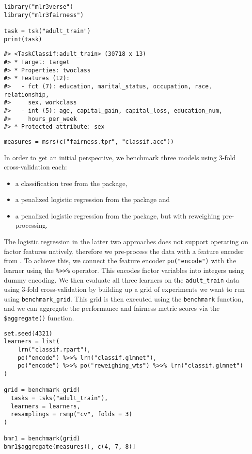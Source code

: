 \begin{verbatim}
library("mlr3verse")
library("mlr3fairness")

task = tsk("adult_train")
print(task)
\end{verbatim}

\begin{verbatim}
#> <TaskClassif:adult_train> (30718 x 13)
#> * Target: target
#> * Properties: twoclass
#> * Features (12):
#>   - fct (7): education, marital_status, occupation, race, relationship,
#>     sex, workclass
#>   - int (5): age, capital_gain, capital_loss, education_num,
#>     hours_per_week
#> * Protected attribute: sex
\end{verbatim}

\begin{verbatim}
measures = msrs(c("fairness.tpr", "classif.acc"))
\end{verbatim}

In order to get an initial perspective, we benchmark three models using 3-fold cross-validation each:

\begin{itemize}
\tightlist
\item
  a classification tree from the  package,
\item
  a penalized logistic regression from the  package and
\item
  a penalized logistic regression from the  package, but with reweighing pre-
  processing.
\end{itemize}

The logistic regression in the latter two approaches does not support operating on factor features natively, therefore we pre-process the data with a feature encoder from .
To achieve this, we connect the feature encoder \texttt{po("encode")} with the learner using the \texttt{\%\textgreater{}\textgreater{}\%} operator.
This encodes factor variables into integers using dummy encoding.
We then evaluate all three learners on the \texttt{adult\_train} data using 3-fold cross-validation by building up a grid of experiments we want to run using \texttt{benchmark\_grid}.
This grid is then executed using the \texttt{benchmark} function, and we can aggregate the performance and fairness metric scores via the \texttt{\$aggregate()} function.

\begin{verbatim}
set.seed(4321)
learners = list(
    lrn("classif.rpart"),
    po("encode") %>>% lrn("classif.glmnet"),
    po("encode") %>>% po("reweighing_wts") %>>% lrn("classif.glmnet")
)

grid = benchmark_grid(
  tasks = tsks("adult_train"),
  learners = learners,
  resamplings = rsmp("cv", folds = 3)
)

bmr1 = benchmark(grid)
bmr1$aggregate(measures)[, c(4, 7, 8)]
\end{verbatim}

